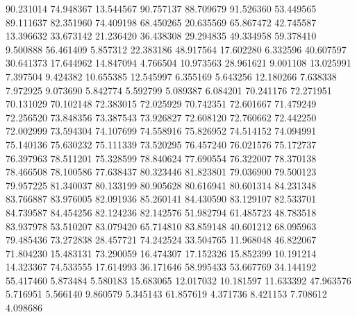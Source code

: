 90.231014
74.948367
13.544567
90.757137
88.709679
91.526360
53.449565
89.111637
82.351960
74.409198
68.450265
20.635569
65.867472
42.745587
13.396632
33.673142
21.236420
36.438308
29.294835
49.334958
59.378410
9.500888
56.461409
5.857312
22.383186
48.917564
17.602280
6.332596
40.607597
30.641373
17.644962
14.847094
4.766504
10.973563
28.961621
9.001108
13.025991
7.397504
9.424382
10.655385
12.545997
6.355169
5.643256
12.180266
7.638338
7.972925
9.073690
5.842774
5.592799
5.089387
6.084201
70.241176
72.271951
70.131029
70.102148
72.383015
72.025929
70.742351
72.601667
71.479249
72.256520
73.848356
73.387543
73.926827
72.608120
72.760662
72.442250
72.002999
73.594304
74.107699
74.558916
75.826952
74.514152
74.094991
75.140136
75.630232
75.111339
73.520295
76.457240
76.021576
75.172737
76.397963
78.511201
75.328599
78.840624
77.690554
76.322007
78.370138
78.466508
78.100586
77.638437
80.323446
81.823801
79.036900
79.500123
79.957225
81.340037
80.133199
80.905628
80.616941
80.601314
84.231348
83.766887
83.976005
82.091936
85.260141
84.430590
83.129107
82.533701
84.739587
84.454256
82.124236
82.142576
51.982794
61.485723
48.783518
83.937978
53.510207
83.079420
65.714810
83.859148
40.601212
68.095963
79.485436
73.272838
28.457721
74.242524
33.504765
11.968048
46.822067
71.804230
15.483131
73.290059
16.474307
17.152326
15.852399
10.191214
14.323367
74.533555
17.614993
36.171646
58.995433
53.667769
34.144192
55.417460
5.873484
5.580183
15.683065
12.017032
10.181597
11.633392
47.963576
5.716951
5.566140
9.860579
5.345143
61.857619
4.371736
8.421153
7.708612
4.098686

